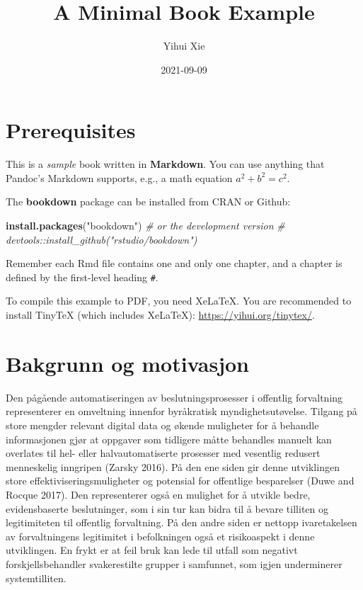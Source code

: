 \documentclass[
]{book}
\title{A Minimal Book Example}
\author{Yihui Xie}
\date{2021-09-09}
\newenvironment{Shaded}{\begin{snugshade}}{\end{snugshade}}
\newcommand{\CommentTok}[1]{\textcolor[rgb]{0.56,0.35,0.01}{\textit{#1}}}
\newcommand{\KeywordTok}[1]{\textcolor[rgb]{0.13,0.29,0.53}{\textbf{#1}}}
\newcommand{\NormalTok}[1]{#1}
\newcommand{\StringTok}[1]{\textcolor[rgb]{0.31,0.60,0.02}{#1}}
\begin{document}
\maketitle

{
\setcounter{tocdepth}{1}
\tableofcontents
}
\hypertarget{prerequisites}{%
\chapter{Prerequisites}\label{prerequisites}}

This is a \emph{sample} book written in \textbf{Markdown}. You can use anything that Pandoc's Markdown supports, e.g., a math equation \(a^2 + b^2 = c^2\).

The \textbf{bookdown} package can be installed from CRAN or Github:

\begin{Shaded}
\begin{Highlighting}[]
\KeywordTok{install.packages}\NormalTok{(}\StringTok{"bookdown"}\NormalTok{)}
\CommentTok{# or the development version}
\CommentTok{# devtools::install_github("rstudio/bookdown")}
\end{Highlighting}
\end{Shaded}

Remember each Rmd file contains one and only one chapter, and a chapter is defined by the first-level heading \texttt{\#}.

To compile this example to PDF, you need XeLaTeX. You are recommended to install TinyTeX (which includes XeLaTeX): \url{https://yihui.org/tinytex/}.

\hypertarget{intro}{%
\chapter{Bakgrunn og motivasjon}\label{intro}}

Den pågående automatiseringen av beslutningsprosesser i offentlig forvaltning representerer en omveltning innenfor byråkratisk myndighetsutøvelse.
Tilgang på store mengder relevant digital data og økende muligheter for å behandle informasjonen gjør at oppgaver som tidligere måtte behandles manuelt kan overlates til hel- eller halvautomatiserte prosesser med vesentlig redusert menneskelig inngripen (Zarsky 2016).
På den ene siden gir denne utviklingen store effektiviseringsmuligheter og potensial for offentlige besparelser (Duwe and Rocque 2017).
Den representerer også en mulighet for å utvikle bedre, evidensbaserte beslutninger, som i sin tur kan bidra til å bevare tilliten og legitimiteten til offentlig forvaltning.
På den andre siden er nettopp ivaretakelsen av forvaltningens legitimitet i befolkningen også et risikoaspekt i denne utviklingen.
En frykt er at feil bruk kan lede til utfall som negativt forskjellsbehandler svakerestilte grupper i samfunnet, som igjen underminerer systemtilliten.
\end{document}
